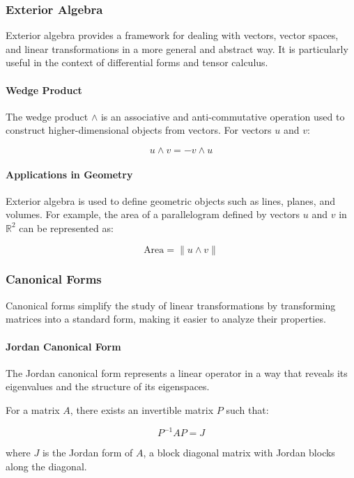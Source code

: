 \documentclass[12pt]{article}
\begin{document}
\subsubsection{Exterior Algebra}

Exterior algebra provides a framework for dealing with vectors, vector spaces, and linear transformations in a more general and abstract way. It is particularly useful in the context of differential forms and tensor calculus.

\paragraph{Wedge Product}

The wedge product \( \wedge \) is an associative and anti-commutative operation used to construct higher-dimensional objects from vectors. For vectors \( u \) and \( v \):

\[
u \wedge v = -v \wedge u
\]

\paragraph{Applications in Geometry}

Exterior algebra is used to define geometric objects such as lines, planes, and volumes. For example, the area of a parallelogram defined by vectors \( u \) and \( v \) in \( \mathbb{R}^2 \) can be represented as:

\[
\text{Area} = \| u \wedge v \|
\]

\subsubsection{Canonical Forms}

Canonical forms simplify the study of linear transformations by transforming matrices into a standard form, making it easier to analyze their properties.

\paragraph{Jordan Canonical Form}

The Jordan canonical form represents a linear operator in a way that reveals its eigenvalues and the structure of its eigenspaces.

For a matrix \( A \), there exists an invertible matrix \( P \) such that:

\[
P^{-1}AP = J
\]

where \( J \) is the Jordan form of \( A \), a block diagonal matrix with Jordan blocks along the diagonal.
\end{document}
